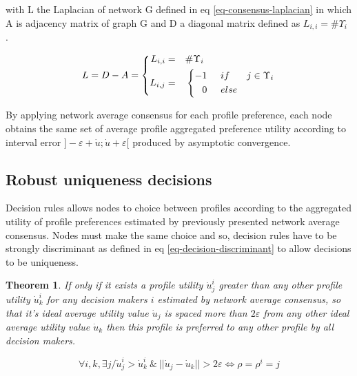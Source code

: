 \documentclass[conference]{IEEEtran}
\newtheorem{theorem}{Theorem}
\begin{document}
with L the Laplacian of network G defined in eq \ref{eq-consensus-laplacian} in which A is adjacency matrix of graph G and D a diagonal matrix defined as $L_{i,i} = \#\Upsilon_i$ .

\begin{equation}
\label{eq-consensus-laplacian}
L = D - A = \left\{
      \begin{aligned}
      L_{i,i} &= &\#\Upsilon_i\hspace{2.6cm}\\
      L_{i,j} &= &\left\{
                \begin{aligned}
                -1 \hspace{0.5cm} &if& j \in \Upsilon_i \\
                 0 \hspace{0.5cm} &else& \\
                \end{aligned}
                \right.
      \end{aligned}
    \right.
\end{equation}

By applying network average consensus for each profile preference, each node obtains the same set of average profile aggregated preference utility according to interval error $]- \varepsilon + \dot{u} ; \dot{u} + \varepsilon [$ produced by asymptotic convergence.

\subsection{Robust uniqueness decisions}
Decision rules allows nodes to choice between profiles according to the aggregated utility of profile preferences estimated by previously presented network average consensus. Nodes must make the same choice and so, decision rules have to be strongly discriminant as defined in eq \ref{eq-decision-discriminant} to allow decisions to be uniqueness. 

\begin{theorem}
\label{th-preference}
If only if it exists a profile utility $\dot{u}_j^i$ greater than any other profile utility $\dot{u}_k^i$ for any decision makers $i$ estimated by network average consensus, so that it's ideal average utility value $\dot{u}_j$ is spaced more than $2 \varepsilon$ from any other ideal average utility value $\dot{u}_k $ then this profile is preferred to any other profile by all decision makers. 
 
\begin{equation}
\label{eq-decision-discriminant}
\forall i, k, \exists j / \dot{u}_j^i > \dot{u}_k^i \ \& \ || \dot{u}_j - \dot{u}_k|| > 2 \varepsilon \Longleftrightarrow \rho = \rho^i = j
\end{equation}

\end{theorem}
\end{document}
